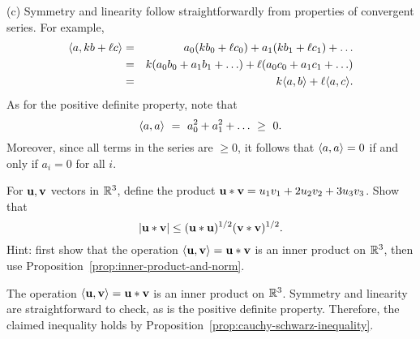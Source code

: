 \begin{ex}
\begin{sol}
    (c) Symmetry and linearity follow straightforwardly from
    properties of convergent series. For example,
    \begin{eqnarray*}
      \langle a,kb+\ell c\rangle
      &=& a_0(kb_0+\ell c_0) + a_1(kb_1+\ell c_1) + \ldots \\
      &=& k(a_0b_0 + a_1b_1 + \ldots) + \ell(a_0c_0 + a_1c_1 + \ldots) \\
      &=& k\langle a,b\rangle + \ell\langle a,c\rangle.
    \end{eqnarray*}
    As for the positive definite property, note that
    \begin{equation*}
      \langle a,a\rangle
      ~=~ a_0^2 + a_1^2 + \ldots
      ~\geq~ 0.      
    \end{equation*}
    Moreover, since all terms in the series are $\geq 0$, it follows
    that $\langle a,a\rangle=0$ if and only if $a_i=0$ for all $i$.
  \end{sol}
\end{ex}

\begin{ex}
  For $\vect{u},\vect{v}$ vectors in $\mathbb{R}^{3}$, define the product
  $\vect{u}\ast \vect{v} = u_{1}v_{1}+2u_{2}v_{2}+3u_{3}v_{3}$. Show
  that 
  \begin{equation*}
    \abs{\vect{u}\ast \vect{v}} \leq (\vect{u}\ast \vect{u})
    ^{1/2}(\vect{v}\ast \vect{v}) ^{1/2}.
  \end{equation*}
  Hint: first show that the operation
  $\iprod{\vect{u},\vect{v}}=\vect{u}\ast\vect{v}$ is an inner product
  on $\mathbb{R}^{3}$, then use Proposition~\ref{prop:inner-product-and-norm}.
  \begin{sol}
    The operation $\iprod{\vect{u},\vect{v}}=\vect{u}\ast\vect{v}$ is
    an inner product on $\mathbb{R}^{3}$. Symmetry and linearity are
    straightforward to check, as is the positive definite
    property. Therefore, the claimed inequality holds by
    Proposition~\ref{prop:cauchy-schwarz-inequality}.
  \end{sol}
\end{ex}

